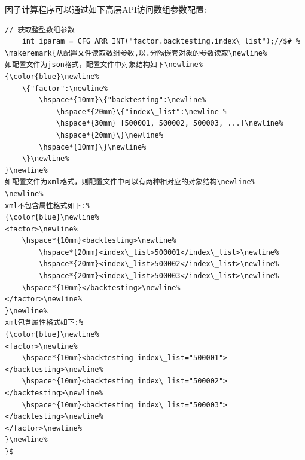 因子计算程序可以通过如下高层API访问数组参数配置:

\begin{lstlisting}[caption=高层API接口-获取数组参数类型,morekeywords={CFG_ARR_ARR_INT,CFG_ARR_DBL,CFG_ARR_STR}]
    // 获取整型数组参数
    int iparam = CFG_ARR_INT("factor.backtesting.index\_list");//$# %
\makeremark{从配置文件读取数组参数,以.分隔嵌套对象的参数读取\newline%
如配置文件为json格式，配置文件中对象结构如下\newline%
{\color{blue}\newline%
    \{"factor":\newline%
        \hspace*{10mm}\{"backtesting":\newline%
            \hspace*{20mm}\{"index\_list":\newline %
            \hspace*{30mm} [500001, 500002, 500003, ...]\newline%
            \hspace*{20mm}\}\newline%
        \hspace*{10mm}\}\newline%
    \}\newline%
}\newline%
如配置文件为xml格式，则配置文件中可以有两种相对应的对象结构\newline%
\newline%
xml不包含属性格式如下:%
{\color{blue}\newline%
<factor>\newline%
    \hspace*{10mm}<backtesting>\newline%
        \hspace*{20mm}<index\_list>500001</index\_list>\newline%
        \hspace*{20mm}<index\_list>500002</index\_list>\newline%
        \hspace*{20mm}<index\_list>500003</index\_list>\newline%
    \hspace*{10mm}</backtesting>\newline%
</factor>\newline%
}\newline%
xml包含属性格式如下:%
{\color{blue}\newline%
<factor>\newline%
    \hspace*{10mm}<backtesting index\_list="500001"></backtesting>\newline%
    \hspace*{10mm}<backtesting index\_list="500002"></backtesting>\newline%
    \hspace*{10mm}<backtesting index\_list="500003"></backtesting>\newline%
</factor>\newline%
}\newline%
}$


\end{lstlisting}
